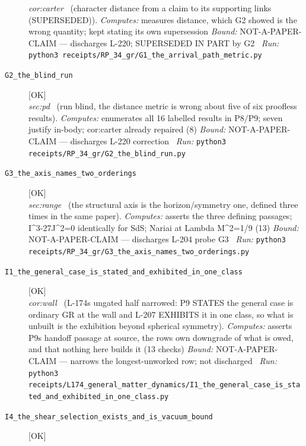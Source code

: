 \begin{description}
\textit{cor:carter} \ (character distance from a claim to its supporting links (SUPERSEDED)). 
\emph{Computes:} measures distance, which G2 showed is the wrong quantity; kept stating its own supersession
 \emph{Bound:} NOT-A-PAPER-CLAIM --- discharges L-220; SUPERSEDED IN PART by G2
\ \emph{Run:} \texttt{python3 receipts/RP\_34\_gr/G1\_the\_arrival\_path\_metric.py}
\item[\label{rcpt:G2_the_blind_run}\textbf{}\quad\texttt{G2\_the\_blind\_run}]\hfill\textsf{[OK]}\\
\textit{sec:pd} \ (run blind, the distance metric is wrong about five of six proofless results). 
\emph{Computes:} enumerates all 16 labelled results in P8/P9; seven justify in-body; cor:carter already repaired (8)
 \emph{Bound:} NOT-A-PAPER-CLAIM --- discharges L-220 correction
\ \emph{Run:} \texttt{python3 receipts/RP\_34\_gr/G2\_the\_blind\_run.py}
\item[\label{rcpt:G3_the_axis_names_two_orderings}\textbf{}\quad\texttt{G3\_the\_axis\_names\_two\_orderings}]\hfill\textsf{[OK]}\\
\textit{sec:range} \ (the structural axis is the horizon/symmetry one, defined three times in the same paper). 
\emph{Computes:} asserts the three defining passages; I\textasciicircum{}3-27J\textasciicircum{}2=0 identically for SdS; Nariai at Lambda M\textasciicircum{}2=1/9 (13)
 \emph{Bound:} NOT-A-PAPER-CLAIM --- discharges L-204 probe G3
\ \emph{Run:} \texttt{python3 receipts/RP\_34\_gr/G3\_the\_axis\_names\_two\_orderings.py}
\item[\label{rcpt:I1_the_general_case_is_stated_and_exhibited_in_one_class}\textbf{}\quad\texttt{I1\_the\_general\_case\_is\_stated\_and\_exhibited\_in\_one\_class}]\hfill\textsf{[OK]}\\
\textit{cor:wall} \ (L-174s ungated half narrowed: P9 STATES the general case is ordinary GR at the wall and L-207 EXHIBITS it in one class, so what is unbuilt is the exhibition beyond spherical symmetry). 
\emph{Computes:} asserts P9s handoff passage at source, the rows own downgrade of what is owed, and that nothing here builds it (13 checks)
 \emph{Bound:} NOT-A-PAPER-CLAIM --- narrows the longest-unworked row; not discharged
\ \emph{Run:} \texttt{python3 receipts/L174\_general\_matter\_dynamics/I1\_the\_general\_case\_is\_stated\_and\_exhibited\_in\_one\_class.py}
\item[\label{rcpt:I4_the_shear_selection_exists_and_is_vacuum_bound}\textbf{}\quad\texttt{I4\_the\_shear\_selection\_exists\_and\_is\_vacuum\_bound}]\hfill\textsf{[OK]}\\

\end{description}
